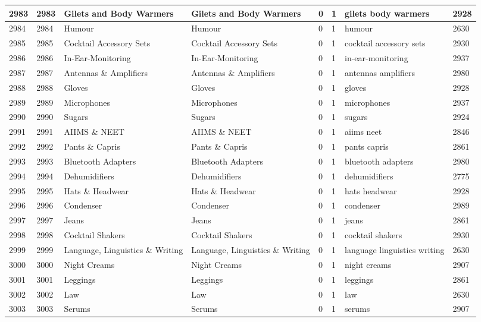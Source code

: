 \begin{longtable}{|l|l|l|l|l|l|l|l|}
2983 & 2983 & Gilets and Body Warmers & Gilets and Body Warmers & 0 & 1 & gilets body warmers & 2928 \\ \hline 
2984 & 2984 & Humour & Humour & 0 & 1 & humour & 2630 \\ \hline 
2985 & 2985 & Cocktail Accessory Sets & Cocktail Accessory Sets & 0 & 1 & cocktail accessory sets & 2930 \\ \hline 
2986 & 2986 & In-Ear-Monitoring & In-Ear-Monitoring & 0 & 1 & in-ear-monitoring & 2937 \\ \hline 
2987 & 2987 & Antennas \& Amplifiers & Antennas \& Amplifiers & 0 & 1 & antennas amplifiers & 2980 \\ \hline 
2988 & 2988 & Gloves & Gloves & 0 & 1 & gloves & 2928 \\ \hline 
2989 & 2989 & Microphones & Microphones & 0 & 1 & microphones & 2937 \\ \hline 
2990 & 2990 & Sugars & Sugars & 0 & 1 & sugars & 2924 \\ \hline 
2991 & 2991 & AIIMS \& NEET & AIIMS \& NEET & 0 & 1 & aiims neet & 2846 \\ \hline 
2992 & 2992 & Pants \& Capris & Pants \& Capris & 0 & 1 & pants capris & 2861 \\ \hline 
2993 & 2993 & Bluetooth Adapters & Bluetooth Adapters & 0 & 1 & bluetooth adapters & 2980 \\ \hline 
2994 & 2994 & Dehumidifiers & Dehumidifiers & 0 & 1 & dehumidifiers & 2775 \\ \hline 
2995 & 2995 & Hats \& Headwear & Hats \& Headwear & 0 & 1 & hats headwear & 2928 \\ \hline 
2996 & 2996 & Condenser & Condenser & 0 & 1 & condenser & 2989 \\ \hline 
2997 & 2997 & Jeans & Jeans & 0 & 1 & jeans & 2861 \\ \hline 
2998 & 2998 & Cocktail Shakers & Cocktail Shakers & 0 & 1 & cocktail shakers & 2930 \\ \hline 
2999 & 2999 & Language, Linguistics \& Writing & Language, Linguistics \& Writing & 0 & 1 & language linguistics writing & 2630 \\ \hline 
3000 & 3000 & Night Creams & Night Creams & 0 & 1 & night creams & 2907 \\ \hline 
3001 & 3001 & Leggings & Leggings & 0 & 1 & leggings & 2861 \\ \hline 
3002 & 3002 & Law & Law & 0 & 1 & law & 2630 \\ \hline 
3003 & 3003 & Serums & Serums & 0 & 1 & serums & 2907 \\ \hline 

\end{longtable}
